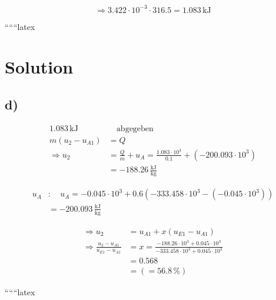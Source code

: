 \[
\Rightarrow 3.422 \cdot 10^{-3} \cdot 316.5 = 1.083 \, \text{kJ}
\]

``````latex

\section*{Solution}

\subsection*{d)}

\begin{align*}
1.083 \, \text{kJ} & \quad \text{abgegeben} \\
m (u_2 - u_{A1}) &= Q \\
\Rightarrow u_2 &= \frac{Q}{m} + u_A = \frac{1.083 \cdot 10^3}{0.1} + (-200.093 \cdot 10^3) \\
&= -188.26 \, \frac{\text{kJ}}{\text{kg}}
\end{align*}

\begin{align*}
u_A &: \quad u_A = -0.045 \cdot 10^3 + 0.6 \left( -333.458 \cdot 10^3 - (-0.045 \cdot 10^3) \right) \\
&= -200.093 \, \frac{\text{kJ}}{\text{kg}}
\end{align*}

\begin{align*}
\Rightarrow u_2 &= u_{A1} + x \left( u_{E1} - u_{A1} \right) \\
\Rightarrow \frac{u_2 - u_{A1}}{u_{E1} - u_{A1}} &= x = \frac{-188.26 \cdot 10^3 + 0.045 \cdot 10^3}{-333.458 \cdot 10^3 + 0.045 \cdot 10^3} \\
&= 0.568 \\
&= ( = 56.8 \, \%)
\end{align*}

``````latex


